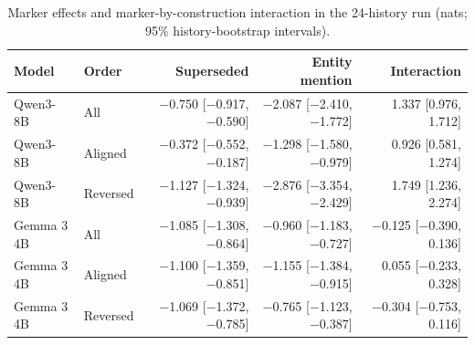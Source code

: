 \begin{table}[h]
\caption{Marker effects and marker-by-construction interaction in the 24-history run (nats; 95\% history-bootstrap intervals).}
\label{tab:d-marker24}
\begin{center}
\small
\begin{tabular}{@{}llrrr@{}}
\toprule
Model & Order & Superseded & Entity mention & Interaction \\
\midrule
Qwen3-8B & All & −0.750 [−0.917, −0.590] & −2.087 [−2.410, −1.772] & 1.337 [0.976, 1.712] \\
Qwen3-8B & Aligned & −0.372 [−0.552, −0.187] & −1.298 [−1.580, −0.979] & 0.926 [0.581, 1.274] \\
Qwen3-8B & Reversed & −1.127 [−1.324, −0.939] & −2.876 [−3.354, −2.429] & 1.749 [1.236, 2.274] \\
\midrule
Gemma 3 4B & All & −1.085 [−1.308, −0.864] & −0.960 [−1.183, −0.727] & −0.125 [−0.390, 0.136] \\
Gemma 3 4B & Aligned & −1.100 [−1.359, −0.851] & −1.155 [−1.384, −0.915] & 0.055 [−0.233, 0.328] \\
Gemma 3 4B & Reversed & −1.069 [−1.372, −0.785] & −0.765 [−1.123, −0.387] & −0.304 [−0.753, 0.116] \\
\bottomrule
\end{tabular}
\end{center}
\end{table}

